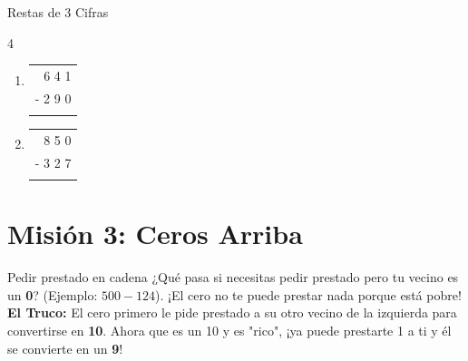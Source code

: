 \documentclass[12pt, letterpaper]{article}
\newcommand{\boxfill}[1][1.2cm]{\tcbox[on line, size=minimal, colframe=valdark!80, colback=white, boxrule=0.5pt, arc=1mm, boxsep=2pt, left=2pt, right=2pt, top=2pt, bottom=2pt]{\makebox[#1]{\vphantom{M}}}}
\begin{document}
\begin{practica}{Restas de 3 Cifras }
\begin{multicols}{4}
\begin{enumerate}[itemsep=1cm]
				\item 
				\begin{tabular}{r}
					6 4 1 \\
					- 2 9 0 \\
					\hline
					\boxfill[1.5cm]
				\end{tabular}
				
				\item 
				\begin{tabular}{r}
					8 5 0 \\
					- 3 2 7 \\
					\hline
					\boxfill[1.5cm]
				\end{tabular}
			\end{enumerate}
		\end{multicols}
	\end{practica}
	
	\vspace{0.8cm}
	
	\section*{Misión 3: Ceros Arriba}
	
	\begin{truco}{Pedir prestado en cadena}
		¿Qué pasa si necesitas pedir prestado pero tu vecino es un \textbf{0}? (Ejemplo: $500 - 124$). ¡El cero no te puede prestar nada porque está pobre!
		\\[0.2cm]
		\textbf{El Truco:} El cero primero le pide prestado a su otro vecino de la izquierda para convertirse en \textbf{10}. Ahora que es un 10 y es "rico", ¡ya puede prestarte 1 a ti y él se convierte en un \textbf{9}!
	\end{truco}
	
\end{document}
